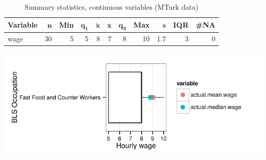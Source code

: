 \documentclass[a4paper,10pt]{article}\usepackage[]{graphicx}\usepackage[]{color}
\makeatletter
\def\maxwidth{ %
  \ifdim\Gin@nat@width>\linewidth
    \linewidth
  \else
    \Gin@nat@width
  \fi
}
\makeatother
\begin{document}
\begin{table}[ht]
\centering
{\footnotesize
\begin{tabular}{lrrrrrrrrrr}
 \textbf{Variable} & $\mathbf{n}$ & \textbf{Min} & $\mathbf{q_1}$ & $\mathbf{\widetilde{x}}$ & $\mathbf{\bar{x}}$ & $\mathbf{q_3}$ & \textbf{Max} & $\mathbf{s}$ & \textbf{IQR} & \textbf{\#NA} \\ 
  \hline
wage & 30 & 5 & 5 & 8 & 7 & 8 & 10 & 1.7 & 3 & 0 \\ 
  \end{tabular}
}
\caption{Summary statistics, continuous variables (MTurk data)} 
\label{tab2:35-3020}
\end{table}


{\centering \includegraphics[width=\maxwidth]{figure/unnamed-chunk-23} 

}
\end{document}
